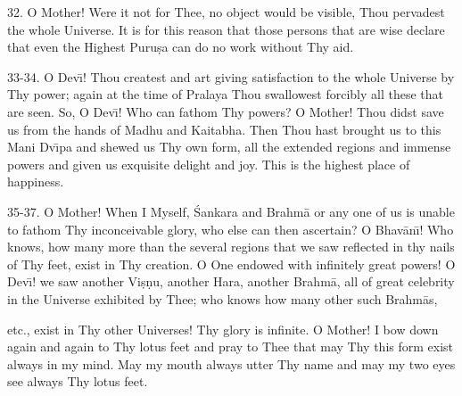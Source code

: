 32. O Mother! Were it not for Thee, no object would be visible, Thou pervadest the whole Universe. It is for this reason that those persons that are wise declare that even the Highest Puru\d{s}a can do no work without Thy aid.

33-34. O Dev\={\i}! Thou createst and art giving satisfaction to the whole Universe by Thy power; again at the time of Pralaya Thou swallowest forcibly all these that are seen. So, O Dev\={\i}! Who can fathom Thy powers? O Mother! Thou didst save us from the hands of Madhu and Kaitabha. Then Thou hast brought us to this Mani Dv\={\i}pa and shewed us Thy own form, all the extended regions and immense powers and given us exquisite delight and joy. This is the highest place of happiness.

35-37. O Mother! When I Myself, \'Sankara and Brahm\=a or any one of us is unable to fathom Thy inconceivable glory, who else can then ascertain? O Bhav\=an\={\i}! Who knows, how many more than the several regions that we saw reflected in thy nails of Thy feet, exist in Thy creation. O One endowed with infinitely great powers! O Dev\={\i}! we saw another Vi\d{s}\d{n}u, another Hara, another Brahm\=a, all of great celebrity in the Universe exhibited by Thee; who knows how many other such Brahm\=as,

etc., exist in Thy other Universes! Thy glory is infinite. O Mother! I bow down again and again to Thy lotus feet and pray to Thee that may Thy this form exist always in my mind. May my mouth always utter Thy name and may my two eyes see always Thy lotus feet.

